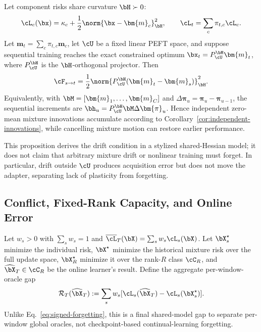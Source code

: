 \begin{proposition}
\label{prop:mixture-bridge}
Let component risks share curvature $\bH\succ0$:
\begin{equation}
  \cL_c(\bx)=\kappa_c+\frac12\norm{\bx-\bm{m}_c}_{\bH}^2,
  \qquad
  \cL_t=\sum_c\pi_{t,c}\cL_c.
  \label{eq:component-quadratic}
\end{equation}
Let $\bm{m}_t=\sum_c\pi_{t,c}\bm{m}_c$, let $\cU$ be a fixed linear PEFT
space, and suppose sequential training reaches the exact constrained optimum
$\bx_t=P_{\cU}^{\bH}\bm{m}_t$, where $P_{\cU}^{\bH}$ is the
$\bH$-orthogonal projector. Then
\begin{equation}
  \cF_{s\to t}
  =\frac12\norm{P_{\cU}^{\bH}(\bm{m}_t-\bm{m}_s)}_{\bH}^2.
  \label{eq:mixture-forgetting}
\end{equation}
Equivalently, with $\bM=[\bm{m}_1,\ldots,\bm{m}_C]$ and
$\Delta\bm{\pi}_u=\bm{\pi}_u-\bm{\pi}_{u-1}$, the sequential increments are
$\bh_u=P_{\cU}^{\bH}\bM\Delta\bm{\pi}_u$. Hence independent zero-mean
mixture innovations accumulate according to
Corollary~\ref{cor:independent-innovations}, while cancelling mixture motion can
restore earlier performance.
\end{proposition}

This proposition derives the drift condition in a stylized shared-Hessian
model; it does not claim that arbitrary mixture drift or nonlinear training
must forget. In particular, drift outside $\cU$ produces acquisition error but
does not move the adapter, separating lack of plasticity from forgetting.

\subsection{Conflict, Fixed-Rank Capacity, and Online Error}

Let $w_s>0$ with $\sum_s w_s=1$ and
$\overline{\cL}_T(\bX)=\sum_s w_s\cL_s(\bX)$. Let $\bX_s^\star$ minimize
the individual risk, $\bX^\star$ minimize the historical mixture risk over the
full update space, $\bX_R^\star$ minimize it over the rank-$R$ class $\cC_R$,
and $\widehat{\bX}_T\in\cC_R$ be the online learner's result.
Define the aggregate per-window-oracle gap
\begin{equation}
  \mathcal{R}_T(\widehat{\bX}_T)
  :=\sum_s w_s[\cL_s(\widehat{\bX}_T)-\cL_s(\bX_s^\star)].
  \label{eq:oracle-retention-gap}
\end{equation}
Unlike Eq.~\eqref{eq:signed-forgetting}, this is a final shared-model gap to
separate per-window global oracles, not checkpoint-based continual-learning
forgetting.

